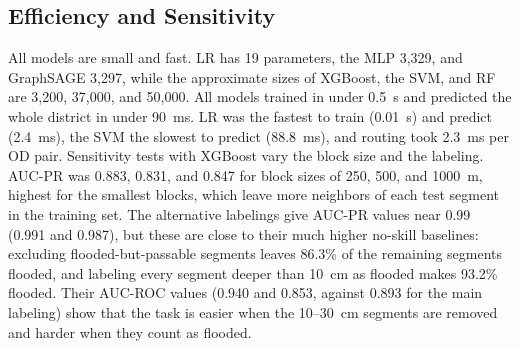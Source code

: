 \subsection{Efficiency and Sensitivity}
\label{sec:sensitivity}
All models are small and fast. LR has 19 parameters, the MLP 3,329, and GraphSAGE 3,297, while the approximate sizes of XGBoost, the SVM, and RF are 3,200, 37,000, and 50,000. All models trained in under 0.5~s and predicted the whole district in under 90~ms. LR was the fastest to train (0.01~s) and predict (2.4~ms), the SVM the slowest to predict (88.8~ms), and routing took 2.3~ms per OD pair. Sensitivity tests with XGBoost vary the block size and the labeling. AUC-PR was 0.883, 0.831, and 0.847 for block sizes of 250, 500, and 1000~m, highest for the smallest blocks, which leave more neighbors of each test segment in the training set. The alternative labelings give AUC-PR values near 0.99 (0.991 and 0.987), but these are close to their much higher no-skill baselines: excluding flooded-but-passable segments leaves 86.3\% of the remaining segments flooded, and labeling every segment deeper than 10~cm as flooded makes 93.2\% flooded. Their AUC-ROC values (0.940 and 0.853, against 0.893 for the main labeling) show that the task is easier when the 10--30~cm segments are removed and harder when they count as flooded.

